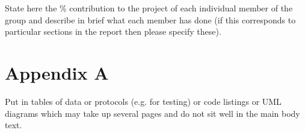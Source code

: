 \documentclass[a4paper, oneside, 11pt]{report}
\begin{document}
State here the \% contribution to the project of each individual member of the group and describe in brief what each member has done (if this corresponds to particular sections in the report then please specify these).

\chapter*{Appendix A}

Put in tables of data or protocols (e.g. for testing) or code listings or UML diagrams which may take up several pages and do not sit well in the main body text.
\end{document}
